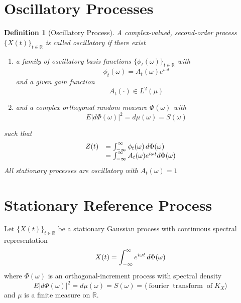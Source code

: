 \documentclass{article}
\newcommand{\cdummy}{\cdot}
\newcommand{\tmem}[1]{{\em #1\/}}
\newcommand{\tmop}[1]{\ensuremath{\operatorname{#1}}}
\newtheorem{definition}{Definition}
\begin{document}
\section{Oscillatory Processes}\label{sec:oscillatory}

\begin{definition}
[Oscillatory Process]\label{def:oscillatory} A complex-valued, second-order
process $\{X (t) \}_{t \in \mathbb{R}}$ is called {\tmem{oscillatory}} if
there exist
\begin{enumerate}
\item a family of oscillatory basis functions $\{\phi_t (\omega)\}_{t \in
\mathbb{R}}$ with
\begin{equation}
\phi_t (\omega) = A_t (\omega) e^{i \omega t}
\end{equation}
and a given gain function
\begin{equation}
A_t (\cdummy) \in L^2 (\mu) \label{envelope}
\end{equation}
\item and a complex orthogonal random measure $\Phi (\omega)$ with
\begin{equation}
E \lvert d \Phi (\omega) \rvert^2 = d \mu (\omega) = S (\omega)
\end{equation}
\end{enumerate}
such that
\begin{equation}
\label{eq:oscillatory_rep} \begin{array}{ll}
Z (t) &= \int_{- \infty}^{\infty} \phi_t (\omega) \hspace{0.17em} d
\Phi (\omega)\\
&= \int_{- \infty}^{\infty} A_t (\omega) e^{i \omega t} d \Phi
(\omega)
\end{array}
\end{equation}
All stationary processes are oscillatory with $A_t (\omega) = 1$
\end{definition}

\section{Stationary Reference Process}\label{sec:stationary}

Let $\{X (t) \}_{t \in \mathbb{R}}$ be a stationary Gaussian process with
continuous spectral representation
\begin{equation}
\label{eq:stationary_rep} X (t) = \int_{- \infty}^{\infty} e^{i \omega t}
\hspace{0.17em} d \Phi (\omega)
\end{equation}
where $\Phi (\omega)$ is an orthogonal-increment process with spectral density
\begin{equation}
E \lvert d \Phi (\omega) \rvert^2 = d \mu (\omega) = S (\omega) = \langle \tmop{fourier} \tmop{transform} \tmop{of} K_X \rangle
\end{equation}
and $\mu$ is a finite measure on $\mathbb{R}$.
\end{document}
